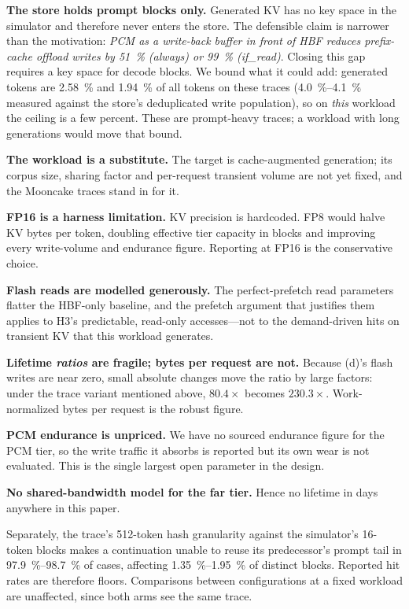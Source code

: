 \documentclass[conference]{IEEEtran}
\newcommand{\cfgd}{\textsf{(d)}}
\begin{document}
\textbf{The store holds prompt blocks only.} Generated KV has no key space in
the simulator and therefore never enters the store. The defensible claim is
narrower than the motivation: \emph{PCM as a write-back buffer in front of HBF
reduces prefix-cache offload writes by \SI{51}{\percent} (always) or
\SI{99}{\percent} (if\_read)}. Closing this gap requires a key space for decode
blocks. We bound what it could add: generated tokens are
\SI{2.58}{\percent} and \SI{1.94}{\percent} of all tokens on these traces
(\SIrange{4.0}{4.1}{\percent} measured against the store's deduplicated write
population), so on \emph{this} workload the ceiling is a few percent. These are
prompt-heavy traces; a workload with long generations would move that bound.

\textbf{The workload is a substitute.} The target is cache-augmented generation;
its corpus size, sharing factor and per-request transient volume are not yet
fixed, and the Mooncake traces stand in for it.

\textbf{FP16 is a harness limitation.} KV precision is hardcoded. FP8 would halve
KV bytes per token, doubling effective tier capacity in blocks and improving
every write-volume and endurance figure. Reporting at FP16 is the conservative
choice.

\textbf{Flash reads are modelled generously.} The perfect-prefetch read
parameters flatter the HBF-only baseline, and the prefetch argument that
justifies them applies to H3's predictable, read-only accesses---not to the
demand-driven hits on transient KV that this workload generates.

\textbf{Lifetime \emph{ratios} are fragile; bytes per request are not.} Because
\cfgd's flash writes are near zero, small absolute changes move the ratio by
large factors: under the trace variant mentioned above, $80.4\times$ becomes
$230.3\times$. Work-normalized bytes per request is the robust figure.

\textbf{PCM endurance is unpriced.} We have no sourced endurance figure for the
PCM tier, so the write traffic it absorbs is reported but its own wear is not
evaluated. This is the single largest open parameter in the design.

\textbf{No shared-bandwidth model for the far tier.} Hence no lifetime in days
anywhere in this paper.

Separately, the trace's \num{512}-token hash granularity against the simulator's
\num{16}-token blocks makes a continuation unable to reuse its predecessor's
prompt tail in \SIrange{97.9}{98.7}{\percent} of cases, affecting
\SIrange{1.35}{1.95}{\percent} of distinct blocks. Reported hit rates are
therefore floors. Comparisons between configurations at a fixed workload are
unaffected, since both arms see the same trace.
\end{document}
